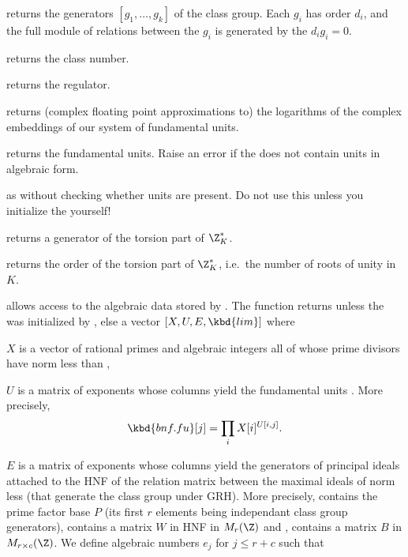  returns the generators $[g_1,\ldots,g_k]$
of the class group. Each $g_i$ has order $d_i$, and the full module of relations
between the $g_i$ is generated by the $d_ig_i = 0$.

 returns the class number.

 returns the regulator.

 returns (complex floating point
approximations to) the logarithms of the complex embeddings of our system of
fundamental units.

 returns the fundamental units. Raise
an error if the  does not contain units in algebraic form.

 as  without
checking whether units are present. Do not use this unless
you initialize the  yourself!

 returns a generator of the torsion part
of $\Z_K^*$.

 returns the order of the torsion part of
$\Z_K^*$, i.e.~the number of roots of unity in $K$.

 allows access to the algebraic data
stored by . The function returns  unless the
 was initialized by , else a vector
$[X,U,E,\kbd{lim}]$ where

\item $X$ is a vector of rational primes and algebraic integers all of whose
prime divisors have norm less than ,

\item $U$ is a matrix of exponents whose columns yield the fundamental units
. More precisely,
$$\kbd{bnf.fu}[j] = \prod_i X[i]^{U[i,j]}.$$

\item $E$ is a matrix of exponents whose columns yield the generators
of principal ideals attached to the HNF of the  relation matrix
between the maximal ideals of norm less  (that generate the class
group under GRH). More precisely,  contains the prime factor
base $P$ (its first $r$ elements being independant class group generators),
 contains a matrix $W$ in HNF in $M_r(\Z)$ and
, contains a matrix $B$ in $M_{r \times c}(\Z)$. We define
algebraic numbers $e_j$ for $j \leq r+c$ such that

